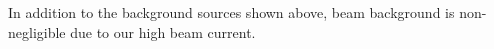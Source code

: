 \documentclass[b1]{sciposter}
\begin{document}
\begin{multicols}{3}

In addition to the background sources shown above, beam background is non-negligible due to our high beam current.

%

        \columnbreak

\end{multicols}
\end{document}
